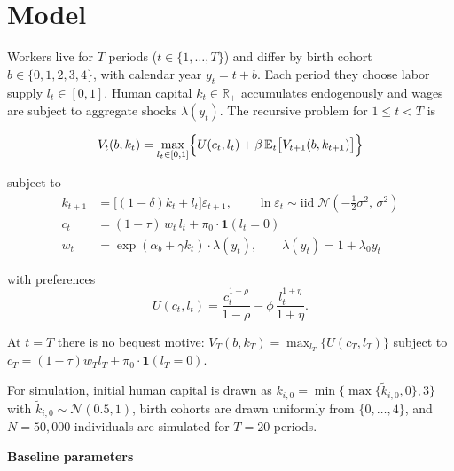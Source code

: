 \section*{Model}

Workers live for $T$ periods ($t \in \{1,\ldots,T\}$) and differ by birth cohort $b \in \{0,1,2,3,4\}$, with calendar year $y_t = t + b$. Each period they choose labor supply $l_t \in [0,1]$. Human capital $k_t \in \mathbb{R}_+$ accumulates endogenously and wages are subject to aggregate shocks $\lambda(y_t)$. The recursive problem for $1 \le t < T$ is

\[
V_t(b,k_t) = \max_{l_t \in [0,1]} \Bigl\{ U(c_t, l_t) + \beta\,\mathbb{E}_t\bigl[V_{t+1}(b, k_{t+1})\bigr] \Bigr\}
\]

subject to
\begin{align*}
k_{t+1} &= \bigl[(1-\delta)k_t + l_t\bigr]\varepsilon_{t+1}, \qquad \ln\varepsilon_t \sim \text{iid}\;\mathcal{N}\!\left(-\tfrac{1}{2}\sigma^2,\,\sigma^2\right) \\
c_t      &= (1-\tau)\,w_t\,l_t + \pi_0 \cdot \mathbf{1}(l_t = 0) \\
w_t      &= \exp(\alpha_b + \gamma k_t)\cdot\lambda(y_t), \qquad \lambda(y_t) = 1 + \lambda_0 y_t
\end{align*}

with preferences
\[
U(c_t, l_t) = \frac{c_t^{1-\rho}}{1-\rho} - \phi\,\frac{l_t^{1+\eta}}{1+\eta}.
\]

At $t = T$ there is no bequest motive: $V_T(b,k_T) = \max_{l_T}\{U(c_T,l_T)\}$ subject to $c_T = (1-\tau)w_T l_T + \pi_0\cdot\mathbf{1}(l_T = 0)$.

\medskip
\noindent For simulation, initial human capital is drawn as $k_{i,0} = \min\{\max\{\tilde{k}_{i,0},0\},3\}$ with $\tilde{k}_{i,0}\sim\mathcal{N}(0.5,1)$, birth cohorts are drawn uniformly from $\{0,\ldots,4\}$, and $N=50{,}000$ individuals are simulated for $T=20$ periods.

\bigskip
\noindent\textbf{Baseline parameters}

